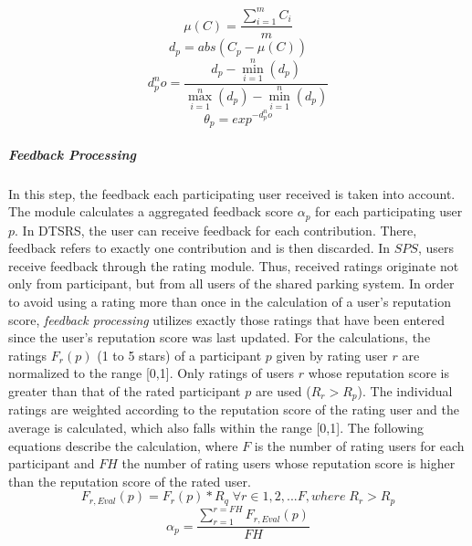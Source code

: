 \begin{equation}
  \mu(C)= \frac{\sum_{i=1}^{m} C_i}{m}
\end{equation}
\begin{equation}
  d_p = abs(C_p - \mu(C))
\end{equation}
\begin{equation}
  d_p^no = \frac{d_p-\min_{i=1}^{n}(d_p)}{\max_{i=1}^{n}(d_p) - \min_{i=1}^{n}(d_p)}
\end{equation}
\begin{equation}
  \theta_p = exp^{-d_p^no}
\end{equation}

\subparagraph{Feedback Processing}In this step, the feedback each participating user received is taken into account. The module calculates a aggregated feedback score $\alpha_p$ for each participating user $p$. In DTSRS, the user can receive feedback for each contribution. There, feedback refers to exactly one contribution and is then discarded. In $SPS$, users receive feedback through the rating module. Thus, received ratings originate not only from participant, but from all users of the shared parking system. In order to avoid using a rating more than once in the calculation of a user's reputation score, \textit{feedback processing} utilizes exactly those ratings that have been entered since the user's reputation score was last updated. For the calculations, the ratings $F_r(p)$ (1 to 5 stars) of a participant $p$ given by rating user $r$ are normalized to the range [0,1]. Only ratings of users $r$ whose reputation score is greater than that of the rated participant $p$ are used ($R_r>R_p$). The individual ratings are weighted according to the reputation score of the rating user and the average is calculated, which also falls within the range [0,1]. The following equations describe the calculation, where $F$ is the number of rating users for each participant and $FH$ the number of rating users whose reputation score is higher than the reputation score of the rated user.
\begin{equation}
  F_{r,Eval}(p)=F_r(p)*R_q\; \forall r \in 1,2,...F, where\; R_r>R_p 
\end{equation}
\begin{equation}
  \alpha_p = \frac{\sum_{r=1}^{r=FH}F_{r,Eval}(p)}{FH}
\end{equation}


